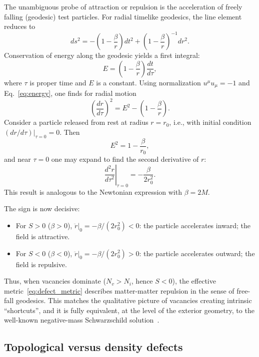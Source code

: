 \documentclass[%
  reprint,
  superscriptaddress,
  showpacs,
  showkeys,
  amsmath,amssymb,
  pra,
  longbibliography,
  floatfix,
  x11names
]{revtex4-2}
\begin{document}
The unambiguous probe of attraction or repulsion is the acceleration of freely falling (geodesic) test particles. For radial timelike geodesics, the line element reduces to
\begin{equation}
ds^2 = -\left(1-\frac{\beta}{r}\right) dt^2
+ \left(1-\frac{\beta}{r}\right)^{-1} dr^2.
\end{equation}
Conservation of energy along the geodesic yields a first integral:
\begin{equation}
E = \left(1-\frac{\beta}{r}\right)\frac{dt}{d\tau},
\label{eq:energy}
\end{equation}
where \(\tau\) is proper time and \(E\) is a constant. Using normalization \(u^\mu u_\mu=-1\) and Eq.~\eqref{eq:energy}, one finds for radial motion
\begin{equation}
\left(\frac{dr}{d\tau}\right)^2 = E^2 - \left(1-\frac{\beta}{r}\right).
\end{equation}
Consider a particle released from rest at radius \(r=r_0\), i.e., with initial condition \((dr/d\tau)|_{\tau=0}=0\). Then
\begin{equation}
E^2 = 1-\frac{\beta}{r_0},
\end{equation}
and near \(\tau=0\) one may expand to find the second derivative of \(r\):
\begin{equation}
\left.\frac{d^2 r}{d\tau^2}\right|_{\tau=0}
= -\frac{\beta}{2 r_0^2}.
\end{equation}
This result is analogous to the Newtonian expression with \(\beta=2M\).

The sign is now decisive:
\begin{itemize}
\item For \(S>0\) (\(\beta>0\)), \(\ddot{r}|_0 = -\beta/(2r_0^2)<0\): the particle accelerates inward; the field is attractive.
\item For \(S<0\) (\(\beta<0\)), \(\ddot{r}|_0 = -\beta/(2r_0^2)>0\): the particle accelerates outward; the field is repulsive.
\end{itemize}
Thus, when vacancies dominate (\(N_v > N_i\), hence \(S<0\)), the effective metric~\eqref{eq:defect_metric} describes matter-matter repulsion in the sense of free-fall geodesics. This matches the qualitative picture of vacancies creating intrinsic ``shortcuts'', and it is fully equivalent, at the level of the exterior geometry, to the well-known negative-mass Schwarzschild solution~\cite{bondi-1957}.

\subsection{Topological versus density defects}
\end{document}
